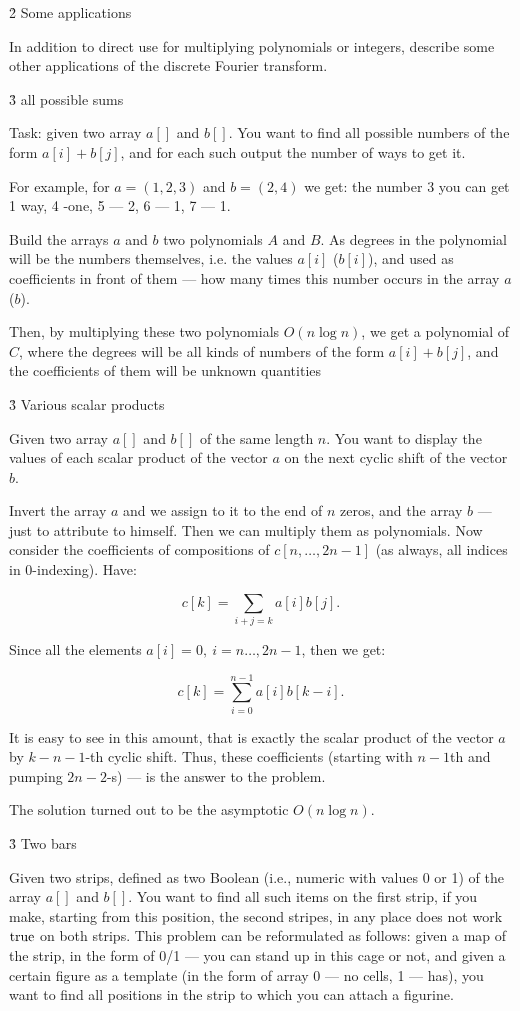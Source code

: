 \h2{ Some applications }

In addition to direct use for multiplying polynomials or integers, describe some other applications of the discrete Fourier transform.


\h3{ all possible sums }

Task: given two array $a[]$ and $b[]$. You want to find all possible numbers of the form $a[i]+b[j]$, and for each such output the number of ways to get it.

For example, for $a = (1,2,3)$ and $b = (2,4)$ we get: the number 3 you can get 1 way, 4 -one, 5 --- 2, 6 --- 1, 7 --- 1.

Build the arrays $a$ and $b$ two polynomials $A$ and $B$. As degrees in the polynomial will be the numbers themselves, i.e. the values $a[i]$ ($b[i]$), and used as coefficients in front of them --- how many times this number occurs in the array $a$ ($b$).

Then, by multiplying these two polynomials $O(n \log n)$, we get a polynomial of $C$, where the degrees will be all kinds of numbers of the form $a[i]+b[j]$, and the coefficients of them will be unknown quantities


\h3{ Various scalar products }

Given two array $a[]$ and $b[]$ of the same length $n$. You want to display the values of each scalar product of the vector $a$ on the next cyclic shift of the vector $b$.

Invert the array $a$ and we assign to it to the end of $n$ zeros, and the array $b$ --- just to attribute to himself. Then we can multiply them as polynomials. Now consider the coefficients of compositions of $c[n, \ldots, 2n-1]$ (as always, all indices in 0-indexing). Have:

$$ c[k] = \sum_{i+j=k} a[i] b[j]. $$

Since all the elements $a[i]=0,\ i=n \ldots, 2n-1$, then we get:

$$ c[k] = \sum_{i=0}^{n-1} a[i] b[k-i]. $$

It is easy to see in this amount, that is exactly the scalar product of the vector $a$ by $k-n-1$-th cyclic shift. Thus, these coefficients (starting with $n-1$th and pumping $2n-2$-s) --- is the answer to the problem.

The solution turned out to be the asymptotic $O (n \log n)$.


\h3{ Two bars }

Given two strips, defined as two Boolean (i.e., numeric with values 0 or 1) of the array $a[]$ and $b[]$. You want to find all such items on the first strip, if you make, starting from this position, the second stripes, in any place does not work $\rm true$ on both strips. This problem can be reformulated as follows: given a map of the strip, in the form of 0/1 --- you can stand up in this cage or not, and given a certain figure as a template (in the form of array 0 --- no cells, 1 --- has), you want to find all positions in the strip to which you can attach a figurine.

